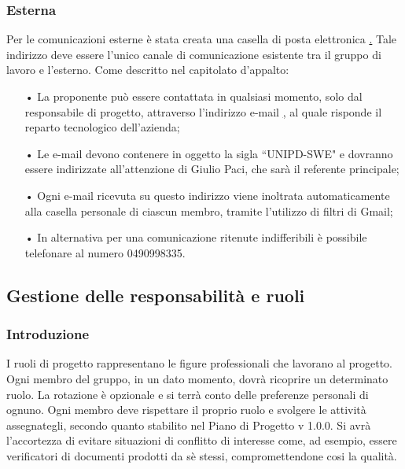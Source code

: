 \subsubsection{Esterna}
Per le comunicazioni esterne è stata creata una casella di posta elettronica \href{SWEight@gmail.com}.
\newline 
Tale indirizzo deve essere l'unico canale di comunicazione esistente tra il gruppo di lavoro e l'esterno. 
\newline
Come descritto nel capitolato d'appalto: 
\begin{itemize}
\item[•] La proponente può essere contattata in qualsiasi momento, solo dal responsabile di progetto, attraverso l'indirizzo e-mail \href{tech@mivoq.it} , al quale risponde il reparto tecnologico dell'azienda;
\item[•] Le e-mail devono contenere in oggetto la sigla “UNIPD-SWE" e dovranno essere indirizzate all'attenzione di Giulio Paci, che sarà il referente principale;
\item[•] Ogni e-mail ricevuta su questo indirizzo viene inoltrata automaticamente alla casella personale di ciascun membro, tramite l'utilizzo di filtri di Gmail;
\item[•] In alternativa per una comunicazione ritenute indifferibili è possibile telefonare al numero 0490998335.
\end{itemize}

\subsection{Gestione delle responsabilità e ruoli}

\subsubsection{Introduzione}
I ruoli di progetto rappresentano le figure professionali che lavorano al progetto. Ogni membro del gruppo, in un dato momento, dovrà ricoprire un determinato ruolo.  
\newline
La rotazione è opzionale e si terrà conto delle preferenze personali di ognuno. Ogni membro deve rispettare il proprio ruolo e svolgere le attività assegnategli, secondo quanto stabilito nel Piano di Progetto v 1.0.0. Si avrà l'accortezza di evitare situazioni di conflitto di interesse come, ad esempio, essere verificatori di documenti prodotti da sè stessi, compromettendone cosi la qualità.


